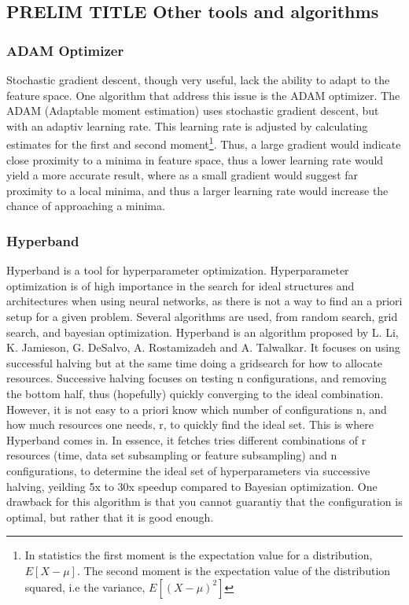 \subsection*{PRELIM TITLE Other tools and algorithms}
\subsubsection*{ADAM Optimizer}
Stochastic gradient descent, though very useful, lack the ability to adapt to the feature space. One algorithm that address this
issue is the ADAM optimizer\cite{ADAM:opti}. The ADAM (Adaptable moment estimation) uses stochastic gradient descent, but with 
an adaptiv learning rate. This learning rate is adjusted by calculating estimates for the first and second moment\footnote{In statistics
the first moment is the expectation value for a distribution, $E[X-\mu]$. The second moment is the 
expectation value of the distribution squared, i.e the variance, $E[(X-\mu)^2]$}. Thus, a large gradient would indicate close proximity 
to a minima in feature space, thus a lower learning rate would yield a more accurate result, 
where as a small gradient would suggest far proximity to a local minima, and thus a larger learning rate would increase the chance 
of approaching a minima.\par 

\subsubsection*{Hyperband}
Hyperband is a tool for hyperparameter optimization\cite{hyperband:opt}. Hyperparameter optimization is of high importance in the 
search for ideal structures and architectures when using neural networks, as there is not a way to find an a priori setup for a 
given problem. Several algorithms are used, from random search, grid search, and bayesian optimization. Hyperband is an algorithm 
proposed by L. Li, K. Jamieson, G. DeSalvo, A. Rostamizadeh and A. Talwalkar. It focuses on using successful halving\cite{successivehalving}
but at the same time doing a gridsearch for how to allocate resources. Successive halving focuses on testing n configurations, and removing 
the bottom half, thus (hopefully) quickly converging to the ideal combination. However, it is not easy to a priori know which 
number of configurations n, and how much resources one needs, r, to quickly find the ideal set. This is where Hyperband comes in. 
In essence, it fetches tries different combinations of r resources (time, data set subsampling or feature subsampling) and n 
configurations, to determine the ideal set of hyperparameters via successive halving, yeilding 5x to 30x speedup compared to 
Bayesian optimization. One drawback for this algorithm is that you cannot guarantiy that the configuration is optimal, 
but rather that it is good enough. 
